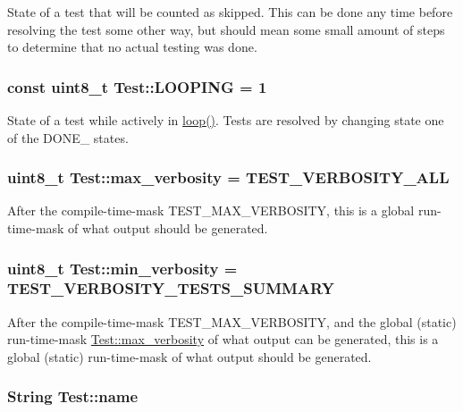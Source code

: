 State of a test that will be counted as skipped. This can be done any time before resolving the test some other way, but should mean some small amount of steps to determine that no actual testing was done. \hypertarget{class_test_ad547575fc6e8ad71bb39542c1abeb7fd}{
\subsubsection[{L\-O\-O\-P\-I\-N\-G}]{\setlength{\rightskip}{0pt plus 5cm}const uint8\-\_\-t Test\-::\-L\-O\-O\-P\-I\-N\-G = 1\hspace{0.3cm}{\ttfamily [static]}}}\label{class_test_ad547575fc6e8ad71bb39542c1abeb7fd}
State of a test while actively in \hyperlink{class_test_a62a1398282c8ef41e33e8f35d165f4b0}{loop()}. Tests are resolved by changing state one of the D\-O\-N\-E\-\_\- states. \hypertarget{class_test_aad3dc21628f5210b9ebdf843eb2b2ae0}{
\subsubsection[{max\-\_\-verbosity}]{\setlength{\rightskip}{0pt plus 5cm}uint8\-\_\-t Test\-::max\-\_\-verbosity = T\-E\-S\-T\-\_\-\-V\-E\-R\-B\-O\-S\-I\-T\-Y\-\_\-\-A\-L\-L\hspace{0.3cm}{\ttfamily [static]}}}\label{class_test_aad3dc21628f5210b9ebdf843eb2b2ae0}
After the compile-\/time-\/mask T\-E\-S\-T\-\_\-\-M\-A\-X\-\_\-\-V\-E\-R\-B\-O\-S\-I\-T\-Y, this is a global run-\/time-\/mask of what output should be generated. \hypertarget{class_test_a1ff0e4cf27254c988233880fff9e6c6d}{
\subsubsection[{min\-\_\-verbosity}]{\setlength{\rightskip}{0pt plus 5cm}uint8\-\_\-t Test\-::min\-\_\-verbosity = T\-E\-S\-T\-\_\-\-V\-E\-R\-B\-O\-S\-I\-T\-Y\-\_\-\-T\-E\-S\-T\-S\-\_\-\-S\-U\-M\-M\-A\-R\-Y\hspace{0.3cm}{\ttfamily [static]}}}\label{class_test_a1ff0e4cf27254c988233880fff9e6c6d}
After the compile-\/time-\/mask T\-E\-S\-T\-\_\-\-M\-A\-X\-\_\-\-V\-E\-R\-B\-O\-S\-I\-T\-Y, and the global (static) run-\/time-\/mask \hyperlink{class_test_aad3dc21628f5210b9ebdf843eb2b2ae0}{Test\-::max\-\_\-verbosity} of what output can be generated, this is a global (static) run-\/time-\/mask of what output should be generated. \hypertarget{class_test_acff24a84a14b606d01913a4a701ca821}{
\subsubsection[{name}]{\setlength{\rightskip}{0pt plus 5cm}String Test\-::name}}\label{class_test_acff24a84a14b606d01913a4a701ca821}
